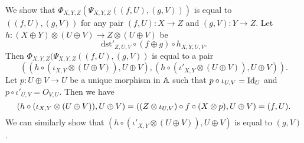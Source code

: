 We show that $\Phi_{X,Y,Z} (\Psi_{X,Y,Z}((f,U),(g,V)))$ is equal to
$((f,U),(g,V))$ for any pair $(f,U) \colon X \to Z$ and $(g,V) \colon
Y \to Z$. Let $h \colon (X \oplus Y) \otimes (U \oplus V) \to
Z \otimes (U \oplus V)$ be
\begin{equation*}
  \mathrm{dst}'_{Z,U,V} \circ (f \oplus g) \circ h_{X,Y,U,V}.
\end{equation*}
Then $\Phi_{X,Y,Z} (\Psi_{X,Y,Z}( (f,U), (g,V) )$ is equal to a pair
\begin{equation*}
  ((h \circ (\iota_{X,Y} \otimes (U \oplus V)),U \oplus V),
  (h \circ (\iota'_{X,Y} \otimes (U \oplus V)),U \oplus V)).
\end{equation*}
Let $p \colon U \oplus V \to U$ be a unique morphism in $\mathbb{A}$
such that $p \circ \iota_{U,V} = \mbox{\normalfont Id}_{U}$ and $p \circ \iota'_{U,V} =
O_{V,U}$. Then we have
\begin{equation*}
  (h \circ (\iota_{X,Y} \otimes (U \oplus V)),U \oplus V)
  = ((Z \otimes \iota_{U,V}) \circ f \circ (X \otimes p), U \oplus V) \\
  = (f,U).
\end{equation*}
We can similarly show that $(h \circ (\iota'_{X,Y} \otimes (U \oplus V)),U
\oplus V)$ is equal to $(g,V)$.


